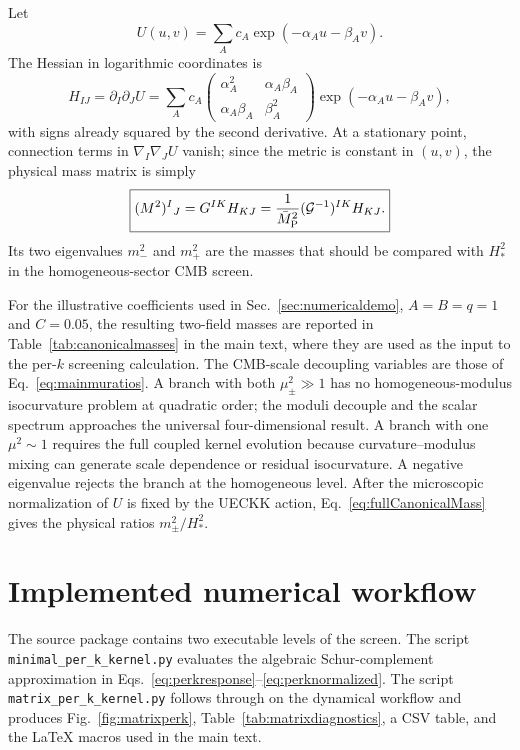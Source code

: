 \documentclass[11pt,a4paper]{article}
\newcommand{\Mpl}{\bar M_{\rm P}}
\begin{document}
Let
\begin{equation}
U(u,v)=\sum_A c_A\exp(-\alpha_A u-\beta_A v).
\end{equation}
The Hessian in logarithmic coordinates is
\begin{equation}
H_{IJ}=\partial_I\partial_JU
=\sum_A c_A
\begin{pmatrix}
\alpha_A^2&\alpha_A\beta_A\\
\alpha_A\beta_A&\beta_A^2
\end{pmatrix}
\exp(-\alpha_Au-\beta_Av),
\label{eq:fullHessianExp}
\end{equation}
with signs already squared by the second derivative. At a stationary point, connection terms in $\nabla_I\nabla_JU$ vanish; since the metric is constant in $(u,v)$, the physical mass matrix is simply
\begin{equation}
\boxed{
(M^2)^I{}_{J}=G^{IK}H_{KJ}
=\frac{1}{\Mpl^2}(\mathcal G^{-1})^{IK}H_{KJ}.
}
\label{eq:fullCanonicalMass}
\end{equation}
Its two eigenvalues $m_-^2$ and $m_+^2$ are the masses that should be compared with $H_*^2$ in the homogeneous-sector CMB screen.

For the illustrative coefficients used in Sec.~\ref{sec:numericaldemo}, $A=B=q=1$ and $C=0.05$, the resulting two-field masses are reported in Table~\ref{tab:canonicalmasses} in the main text, where they are used as the input to the per-$k$ screening calculation. The CMB-scale decoupling variables are those of Eq.~\eqref{eq:mainmuratios}.
A branch with both $\mu_\pm^2\gg1$ has no homogeneous-modulus isocurvature problem at quadratic order; the moduli decouple and the scalar spectrum approaches the universal four-dimensional result. A branch with one $\mu^2\sim1$ requires the full coupled kernel evolution because curvature--modulus mixing can generate scale dependence or residual isocurvature. A negative eigenvalue rejects the branch at the homogeneous level. After the microscopic normalization of $U$ is fixed by the UECKK action, Eq.~\eqref{eq:fullCanonicalMass} gives the physical ratios $m_\pm^2/H_*^2$.

\section{Implemented numerical workflow}
\label{app:numericalworkflow}
The source package contains two executable levels of the screen.  The script \texttt{minimal\_per\_k\_kernel.py} evaluates the algebraic Schur-complement approximation in Eqs.~\eqref{eq:perkresponse}--\eqref{eq:perknormalized}.  The script \texttt{matrix\_per\_k\_kernel.py} follows through on the dynamical workflow and produces Fig.~\ref{fig:matrixperk}, Table~\ref{tab:matrixdiagnostics}, a CSV table, and the \LaTeX{} macros used in the main text.
\end{document}
